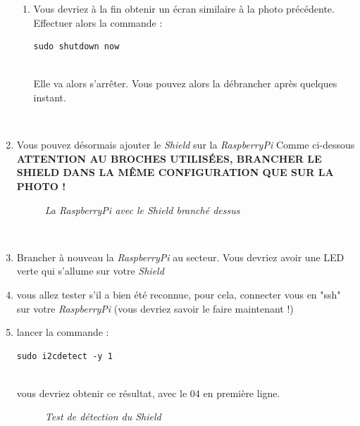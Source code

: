 \begin{enumerate}
\begin{enumerate}
	\item Vous devriez à la fin obtenir un écran similaire à la photo précédente.\\ 
	Effectuer alors la commande :
	\begin{lstlisting}[style=MyBashStyle]
	sudo shutdown now
	\end{lstlisting}\\
	Elle va alors s'arrêter. Vous pouvez alors la débrancher après quelques instant.
	\end{enumerate}\\
	
		\item Vous pouvez désormais ajouter le \textit{Shield} sur la \textit{RaspberryPi} Comme ci-dessous \textbf{ATTENTION AU BROCHES UTILISÉES, BRANCHER LE SHIELD DANS LA MÊME CONFIGURATION QUE SUR LA PHOTO !}\\
		
	\begin{figure}[H]
	\begin{center}
	\end{center}
		\caption{ \textit{La RaspberryPi avec le Shield branché dessus}}
	\end{figure}\\
	
		\item Brancher à nouveau la \textit{RaspberryPi} au secteur. Vous devriez avoir une LED verte qui s'allume sur votre \textit{Shield}
		\item vous allez tester s'il a bien été reconnue, pour cela, connecter vous en "ssh" sur votre \textit{RaspberryPi} (vous devriez savoir le faire maintenant !)
		\item lancer la commande :
		\begin{lstlisting}[style=MyBashStyle]
	sudo i2cdetect -y 1
		\end{lstlisting}\\
	
vous devriez obtenir ce résultat, avec le 04 en première ligne.\\

\begin{figure}[H]
\begin{center}
\end{center}
	\caption{ \textit{Test de détection du Shield}}
\end{figure}\\

\end{enumerate}\\

